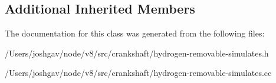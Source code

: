 \subsection*{Additional Inherited Members}


The documentation for this class was generated from the following files\+:\begin{DoxyCompactItemize}
\item 
/\+Users/joshgav/node/v8/src/crankshaft/hydrogen-\/removable-\/simulates.\+h\item 
/\+Users/joshgav/node/v8/src/crankshaft/hydrogen-\/removable-\/simulates.\+cc\end{DoxyCompactItemize}
